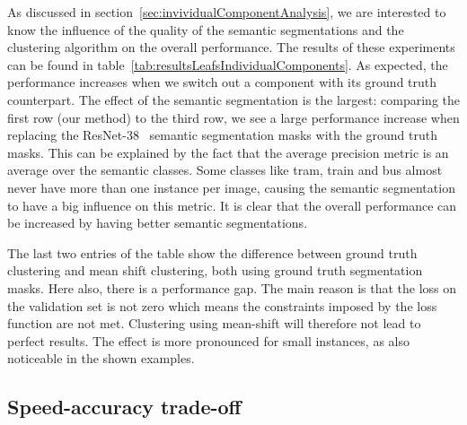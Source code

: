 \documentclass[10pt,twocolumn,letterpaper]{article}
\begin{document}
As discussed in section~\ref{sec:invividualComponentAnalysis}, we are interested to know the influence of the quality of the semantic segmentations and the clustering algorithm on the overall performance. The results of these experiments can be found in table~\ref{tab:resultsLeafsIndividualComponents}.
As expected, the performance increases when we switch out a component with its ground truth counterpart. The effect of the semantic segmentation is the largest: comparing the first row (our method) to the third row, we see a large performance increase when replacing the ResNet-38~\cite{wu2016wider} semantic segmentation masks with the ground truth masks. This can be explained by the fact that the average precision metric is an average over the semantic classes. Some classes like tram, train and bus almost never have more than one instance per image, causing the semantic segmentation to have a big influence on this metric. It is clear that the overall performance can be increased by having better semantic segmentations. 

The last two entries of the table show the difference between ground truth clustering and mean shift clustering, both using ground truth segmentation masks. Here also, there is a performance gap. The main reason is that the loss on the validation set is not zero which means the constraints imposed by the loss function are not met. Clustering using mean-shift will therefore not lead to perfect results. The effect is more pronounced for small instances, as also noticeable in the shown examples.

\subsection{Speed-accuracy trade-off}
\end{document}
